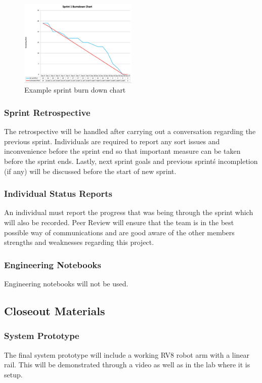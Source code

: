 \begin{figure}[h!]
    \centering
    \includegraphics[width=0.5\textwidth]{images/burndown_example2.png}
    \caption{Example sprint burn down chart}
\end{figure}

\subsubsection{Sprint Retrospective}
The retrospective will be handled after carrying out a conversation regarding the previous sprint. Individuals are required to report any sort issues and inconvenience before the sprint end so that important measure can be taken before the sprint ends. Lastly, next sprint goals and previous sprint\'s incompletion (if any) will be discussed before the start of new sprint.  

\subsubsection{Individual Status Reports}
An individual must report the progress that was being through the sprint which will also be recorded. Peer Review will ensure that the team is in the best possible way of communications and are good aware of the other members strengths and weaknesses regarding this project. 

\subsubsection{Engineering Notebooks}
Engineering notebooks will not be used. 

\subsection{Closeout Materials}

\subsubsection{System Prototype}
The final system prototype will include a working RV8 robot arm with a linear rail. This will be demonstrated through a video as well as in the lab where it is setup. 


